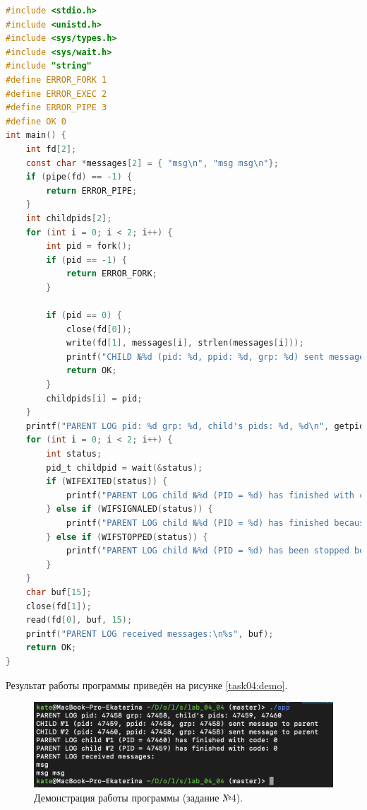 \documentclass[12pt]{report}
\begin{document}
\begin{lstlisting}[label=task04:prog,caption=Программные каналы,language=C]
#include <stdio.h>
#include <unistd.h>
#include <sys/types.h>
#include <sys/wait.h>
#include "string"
#define ERROR_FORK 1
#define ERROR_EXEC 2
#define ERROR_PIPE 3
#define OK 0
int main() {
    int fd[2];
    const char *messages[2] = { "msg\n", "msg msg\n"};
    if (pipe(fd) == -1) {
        return ERROR_PIPE;
    }
    int childpids[2];
    for (int i = 0; i < 2; i++) {
        int pid = fork();
        if (pid == -1) {
            return ERROR_FORK;
        }

        if (pid == 0) {
            close(fd[0]);
            write(fd[1], messages[i], strlen(messages[i]));
            printf("CHILD №%d (pid: %d, ppid: %d, grp: %d) sent message to parent\n", i + 1, getpid(), getppid(), getpgrp());
            return OK;
        }
        childpids[i] = pid;
    }
    printf("PARENT LOG pid: %d grp: %d, child's pids: %d, %d\n", getpid(), getpgrp(), childpids[0], childpids[1]);
    for (int i = 0; i < 2; i++) {
        int status;
        pid_t childpid = wait(&status);
        if (WIFEXITED(status)) {
            printf("PARENT LOG child №%d (PID = %d) has finished with code: %d\n", i + 1, childpid, WEXITSTATUS(status));
        } else if (WIFSIGNALED(status)) {
            printf("PARENT LOG child №%d (PID = %d) has finished because of signal: %d\n", i + 1, childpid, WTERMSIG(status));
        } else if (WIFSTOPPED(status)) {
            printf("PARENT LOG child №%d (PID = %d) has been stopped because of signal: %d\n", i + 1, childpid, WSTOPSIG(status));
        }
    }
    char buf[15];
    close(fd[1]);
    read(fd[0], buf, 15);
    printf("PARENT LOG received messages:\n%s", buf);
    return OK;
}
\end{lstlisting}

Результат работы программы приведён на рисунке \ref{task04:demo}. 
\begin{figure}[H]

	\centering

	\includegraphics[width=\linewidth]{task04.png}
	\caption{Демонстрация работы программы (задание №4).}

	\label{fig:task04}

\end{figure}
\newpage
\end{document}
